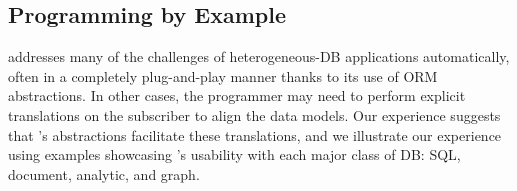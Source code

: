 \subsection{\synapse Programming by Example}
\label{sec:examples}

\synapse addresses many of the challenges of heterogeneous-DB applications automatically, often in a completely plug-and-play manner thanks to its use of ORM abstractions.
In other cases, the programmer may need to perform explicit translations on the subscriber to align the data models.
Our experience suggests that \synapse's abstractions facilitate these translations, and we illustrate our experience using examples showcasing \synapse's usability with each major class of DB: SQL, document, analytic, and graph.



